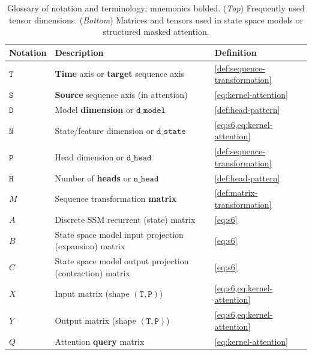 \documentclass{article}
\begin{document}
\begin{table}[!h]
  \caption{
    Glossary of notation and terminology; mnemonics bolded.
    (\emph{Top}) Frequently used tensor dimensions.
    (\emph{Bottom}) Matrices and tensors used in state space models or structured masked attention.
  }
  \centering
  \begin{tabular}{@{}lll@{}}
    \toprule
    Notation       & Description                                                                & Definition \\
    \midrule
    $\mathtt{T}$   & \textbf{Time} axis or \textbf{target} sequence axis                        & \cref{def:sequence-transformation} \\
    $\mathtt{S}$   & \textbf{Source} sequence axis (in attention)                               & \cref{eq:kernel-attention} \\
    $\mathtt{D}$   & Model \textbf{dimension} or $\mathtt{d\_model}$                            & \cref{def:head-pattern} \\
    $\mathtt{N}$   & State/feature dimension or $\mathtt{d\_state}$                             & \cref{eq:s6,eq:kernel-attention} \\
    $\mathtt{P}$   & Head dimension or $\mathtt{d\_head}$                                       & \cref{def:sequence-transformation} \\
    $\mathtt{H}$   & Number of \textbf{heads} or $\mathtt{n\_head}$                             & \cref{def:head-pattern} \\
    \midrule
    $M$            & Sequence transformation \textbf{matrix}                                    & \cref{def:matrix-transformation} \\
    $A$            & Discrete SSM recurrent (state) matrix                                      & \cref{eq:s6} \\
    $B$            & State space model input projection (expansion) matrix                      & \cref{eq:s6} \\
    $C$            & State space model output projection (contraction) matrix                   & \cref{eq:s6} \\
    $X$            & Input matrix (shape $\mathtt{(T, P)}$)                                     & \cref{eq:s6,eq:kernel-attention} \\
    $Y$            & Output matrix (shape $\mathtt{(T, P)}$)                                    & \cref{eq:s6,eq:kernel-attention} \\
    $Q$            & Attention \textbf{query} matrix                                            & \cref{eq:kernel-attention} \\

\end{tabular}
\end{table}
\end{document}
